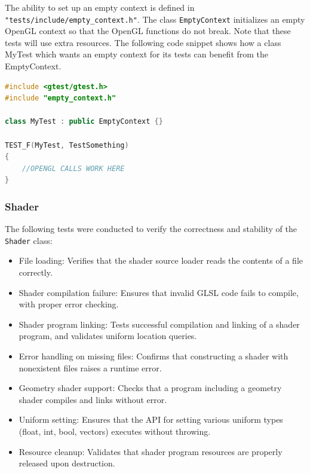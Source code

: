 The ability to set up an empty context is defined in \texttt{"tests/include/empty\_context.h"}. The class \texttt{EmptyContext} initializes an empty OpenGL context so that the OpenGL functions do not break. Note that these tests will use extra resources. The following code snippet shows how a class MyTest which wants an empty context for its tests can benefit from the EmptyContext.

\begin{lstlisting}[language=C++]
#include <gtest/gtest.h>
#include "empty_context.h"

class MyTest : public EmptyContext {}

TEST_F(MyTest, TestSomething)
{
    //OPENGL CALLS WORK HERE
}

\end{lstlisting}


\subsubsection{Shader}
The following tests were conducted to verify the correctness and stability of the \texttt{Shader} class:
\begin{itemize}
    \item File loading: Verifies that the shader source loader reads the contents of a file correctly.
    \item Shader compilation failure: Ensures that invalid GLSL code fails to compile, with proper error checking.
    \item Shader program linking: Tests successful compilation and linking of a shader program, and validates uniform location queries.
    \item Error handling on missing files: Confirms that constructing a shader with nonexistent files raises a runtime error.
    \item Geometry shader support: Checks that a program including a geometry shader compiles and links without error.
    \item Uniform setting: Ensures that the API for setting various uniform types (float, int, bool, vectors) executes without throwing.
    \item Resource cleanup: Validates that shader program resources are properly released upon destruction.
\end{itemize}


